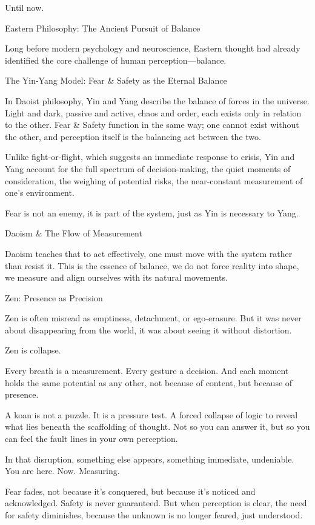 \documentclass[11pt]{article}
\begin{document}
Until now.

Eastern Philosophy: The Ancient Pursuit of Balance

Long before modern psychology and neuroscience, Eastern thought had already identified the core challenge of human perception—balance.

The Yin-Yang Model: Fear & Safety as the Eternal Balance

In Daoist philosophy, Yin and Yang describe the balance of forces in the universe. Light and dark, passive and active, chaos and order, each exists only in relation to the other. Fear & Safety function in the same way; one cannot exist without the other, and perception itself is the balancing act between the two.

Unlike fight-or-flight, which suggests an immediate response to crisis, Yin and Yang account for the full spectrum of decision-making, the quiet moments of consideration, the weighing of potential risks, the near-constant measurement of one's environment.

Fear is not an enemy, it is part of the system, just as Yin is necessary to Yang.

Daoism & The Flow of Measurement

Daoism teaches that to act effectively, one must move with the system rather than resist it. This is the essence of balance, we do not force reality into shape, we measure and align ourselves with its natural movements.

Zen: Presence as Precision

Zen is often misread as emptiness, detachment, or ego-erasure. But it was never about disappearing from the world, it was about seeing it without distortion.

Zen is collapse.

Every breath is a measurement. Every gesture a decision.
And each moment holds the same potential as any other, not because of content, but because of presence.

A koan is not a puzzle. It is a pressure test. A forced collapse of logic to reveal what lies beneath the scaffolding of thought. Not so you can answer it, but so you can feel the fault lines in your own perception.

In that disruption, something else appears, something immediate, undeniable. 
You are here. Now. Measuring.

Fear fades, not because it’s conquered, but because it’s noticed and acknowledged. 
Safety is never guaranteed. But when perception is clear, the need for safety diminishes, because the unknown is no longer feared, just understood.
\end{document}
